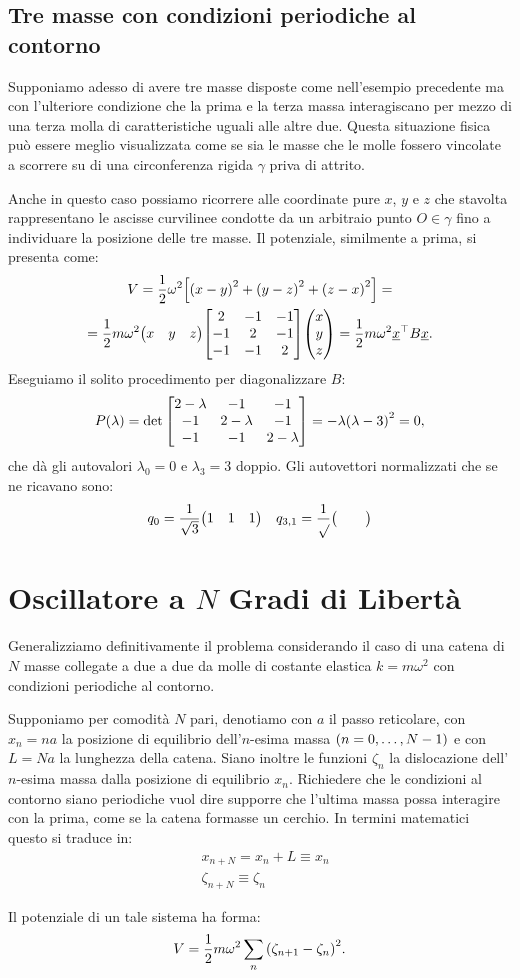     \subsection{Tre masse con condizioni periodiche al contorno}
        Supponiamo adesso di avere tre masse disposte come nell'esempio precedente ma con l'ulteriore condizione che la prima e la terza massa interagiscano per mezzo di una terza molla di caratteristiche uguali alle altre due. Questa situazione fisica pu\`o essere meglio visualizzata come se sia le masse che le molle fossero vincolate a scorrere su di una circonferenza rigida $\gamma$ priva di attrito. \par Anche in questo caso possiamo ricorrere alle coordinate pure $x$, $y$ e $z$ che stavolta rappresentano le ascisse curvilinee condotte da un arbitraio punto $O\in\gamma$ fino a individuare la posizione delle tre masse. Il potenziale, similmente a prima, si presenta come: 
        \begin{multline*}
            V=\frac{1}{2}\omega^2\qty[\qty(x-y)^2+\qty(y-z)^2+\qty(z-x)^2]=\\=\frac{1}{2}m\omega^2\mqty(x & y & z)\mqty[\dmat[-1]{2,2,2}]\mqty(x \\ y \\ z)=\frac{1}{2}m\omega^2\underline{x}^\top B\underline{x}.
        \end{multline*}
        Eseguiamo il solito procedimento per diagonalizzare $B$:
            $$P\qty(\lambda)=\det\mqty[\dmat[-1]{2-\lambda,2-\lambda,2-\lambda}]=-\lambda\qty(\lambda-3)^2=0,$$
        che d\`a gli autovalori $\lambda_0=0$ e $\lambda_3=3$ doppio. Gli autovettori normalizzati che se ne ricavano sono:
            $$q_0=\frac{1}{\sqrt{3}}\mqty(1 & 1 & 1)\quad q_{3,1}=\frac{1}{\sqrt{}}\mqty( & & )$$
\section{Oscillatore a $N$ Gradi di Libert\`a}
    Generalizziamo definitivamente il problema considerando il caso di una catena di $N$ masse collegate a due a due da molle di costante elastica $k=m\omega^2$ con condizioni periodiche al contorno. \par Supponiamo per comodit\`a $N$ pari, denotiamo con $a$ il passo reticolare, con $x_n=na$ la posizione di equilibrio dell'$n$-esima massa $\qty(n=0,\dots,N-1)$ e con $L=Na$ la lunghezza della catena. Siano inoltre le funzioni $\zeta_n$ la dislocazione dell'$n$-esima massa dalla posizione di equilibrio $x_n$. Richiedere che le condizioni al contorno siano periodiche vuol dire supporre che l'ultima massa possa interagire con la prima, come se la catena formasse un cerchio. In termini matematici questo si traduce in:
    \begin{align}
        &x_{n+N}=x_n+L\equiv x_n \label{eq:period:1}\\
        &\zeta_{n+N}\equiv \zeta_n \label{eq:period:2}
    \end{align} \par
    Il potenziale di un tale sistema ha forma:
    \begin{equation}
        V=\frac{1}{2}m\omega^2\sum_n\qty(\zeta_{n+1}-\zeta_n)^2.
        \label{eq:potenziale:2}
    \end{equation}
